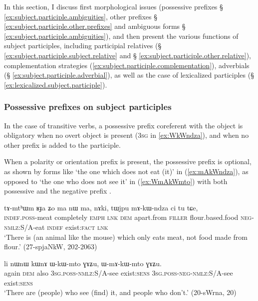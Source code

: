 In this section, I discuss first morphological issues (possessive prefixes § \ref{ex:subject.participle.ambiguities}, other prefixes § \ref{ex:subject.participle.other.prefixes} and ambiguous forms § \ref{ex:subject.participle.ambiguities}), and then present the various functions of subject participles, including participial relatives (§ \ref{ex:subject.participle.subject.relative} and § \ref{ex:subject.participle.other.relative}), complementation strategies (\ref{ex:subject.participle.complementation}), adverbials (§ \ref{ex:subject.participle.adverbial}), as well as the case of lexicalized participles (§ \ref{ex:lexicalized.subject.participle}).
 
 

\subsubsection{Possessive prefixes on subject participles}  \label{ex:subject.participle.possessive}

In the case of transitive verbs, a possessive prefix coreferent with the object is obligatory when no overt object is present (\textsc{3sg}  in \ref{ex:WkWndza}), and when no other prefix is added to the participle.

When a polarity or orientation prefix is present, the possessive prefix is optional, as shown by forms like  `the one which does not eat (it)' in (\ref{ex:mAkWndza}), as opposed to  `the one who does not see it' in (\ref{ex:WmAkWmto}) with both possessive  and the negative prefix .

 \begin{exe} 
\ex \label{ex:mAkWndza}
\gll  tɤ-mtʰɯm ʁɟa ʑo ma nɯ ma, nɤki, tɯjpu mɤ-kɯ-ndza ci tu tɕe, \\
\textsc{indef}.\textsc{poss}-meat completely \textsc{emph} \textsc{lnk} \textsc{dem} apart.from \textsc{filler} flour.based.food \textsc{neg}-\textsc{nmlz}:S/A-eat \textsc{indef} exist:\textsc{fact} \textsc{lnk} \\
\glt  `There is (an animal like the mouse) which only eats meat, not food made from flour.' (27-spjaNkW, 202-2063)
\end{exe}

 \begin{exe} 
\ex \label{ex:WmAkWmto}
\gll  li nɯnɯ kɯnɤ ɯ-kɯ-mto ɣɤʑu, ɯ-mɤ-kɯ-mto ɣɤʑu. \\
again \textsc{dem} also \textsc{3sg}.\textsc{poss}-\textsc{nmlz}:S/A-see exist:\textsc{sens} \textsc{3sg}.\textsc{poss}-\textsc{neg}-\textsc{nmlz}:S/A-see exist:\textsc{sens} \\
\glt `There are (people) who see (find) it, and people who don't.' (20-sWrna, 20)
\end{exe}


